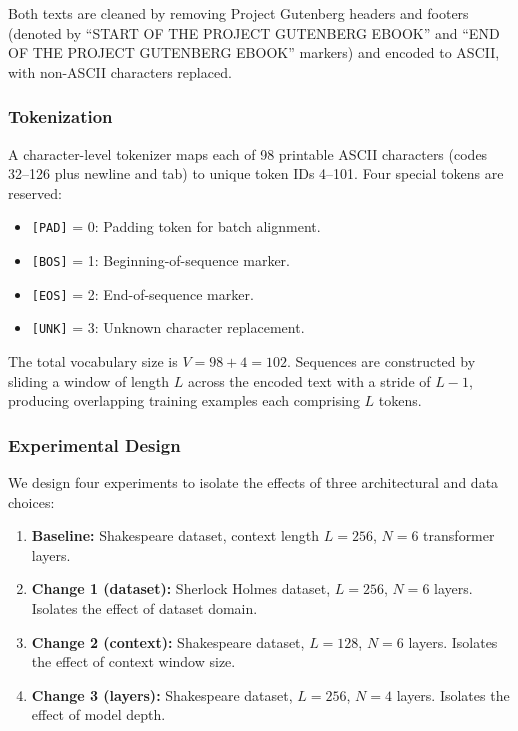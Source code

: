 \documentclass[conference]{IEEEtran}
\begin{document}
Both texts are cleaned by removing Project Gutenberg headers and footers (denoted by ``START OF THE PROJECT GUTENBERG EBOOK'' and ``END OF THE PROJECT GUTENBERG EBOOK'' markers) and encoded to ASCII, with non-ASCII characters replaced.

\subsubsection{Tokenization}

A character-level tokenizer maps each of 98 printable ASCII characters (codes 32--126 plus newline and tab) to unique token IDs 4--101. Four special tokens are reserved:

\begin{itemize}
    \item \texttt{[PAD]} = 0: Padding token for batch alignment.
    \item \texttt{[BOS]} = 1: Beginning-of-sequence marker.
    \item \texttt{[EOS]} = 2: End-of-sequence marker.
    \item \texttt{[UNK]} = 3: Unknown character replacement.
\end{itemize}

The total vocabulary size is $V = 98 + 4 = 102$. Sequences are constructed by sliding a window of length $L$ across the encoded text with a stride of $L - 1$, producing overlapping training examples each comprising $L$ tokens.

\subsubsection{Experimental Design}

We design four experiments to isolate the effects of three architectural and data choices:

\begin{enumerate}
    \item \textbf{Baseline:} Shakespeare dataset, context length $L = 256$, $N = 6$ transformer layers.
    \item \textbf{Change 1 (dataset):} Sherlock Holmes dataset, $L = 256$, $N = 6$ layers. Isolates the effect of dataset domain.
    \item \textbf{Change 2 (context):} Shakespeare dataset, $L = 128$, $N = 6$ layers. Isolates the effect of context window size.
    \item \textbf{Change 3 (layers):} Shakespeare dataset, $L = 256$, $N = 4$ layers. Isolates the effect of model depth.
\end{enumerate}
\end{document}
